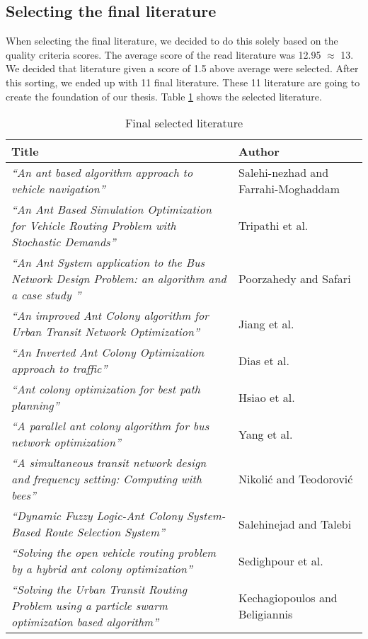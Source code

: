 \subsection{Selecting the final literature}
When selecting the final literature, we decided to do this solely based on the quality criteria scores. The average score of the read literature was 12.95 $\approx$ 13. We decided that literature given a score of 1.5 above average were selected. After this sorting, we ended up with 11 final literature. These 11 literature are going to create the foundation of our thesis. Table \ref{table:finalliterature} shows the selected literature. 

\begin{table}[!htb]
    {
    \begin{center}
    \begin{tabular}[c]{| m{6cm} | m{6cm} |}
        \hline
        \textbf{Title} & \textbf{Author} \\ \hline
        \textit{``An ant based algorithm approach to vehicle navigation''} & Salehi-nezhad and Farrahi-Moghaddam \\ \hline
        \textit{``An Ant Based Simulation Optimization for Vehicle Routing Problem with Stochastic Demands''} & Tripathi et al. \\ \hline
        \textit{``An Ant System application to the Bus Network Design Problem: an algorithm and a case study ''} & Poorzahedy and Safari \\ \hline
        \textit{``An improved Ant Colony algorithm for Urban Transit Network Optimization''} & Jiang et al. \\ \hline
        \textit{``An Inverted Ant Colony Optimization approach to traffic''} & Dias et al. \\ \hline
        \textit{``Ant colony optimization for best path planning''} & Hsiao et al. \\ \hline
        \textit{``A parallel ant colony algorithm for bus network optimization''} & Yang et al. \\ \hline
        \textit{``A simultaneous transit network design and frequency setting: Computing with bees''} & Nikolić and Teodorović \\ \hline
        \textit{``Dynamic Fuzzy Logic-Ant Colony System-Based Route Selection System''} & Salehinejad and Talebi \\ \hline
        \textit{``Solving the open vehicle routing problem by a hybrid ant colony optimization''} & Sedighpour et al. \\ \hline
        \textit{``Solving the Urban Transit Routing Problem using a particle swarm optimization based algorithm''} & Kechagiopoulos and Beligiannis \\ 
        \hline
    \end{tabular}
    \end{center}
    } 
\caption{Final selected literature}\label{table:finalliterature}
\end{table}